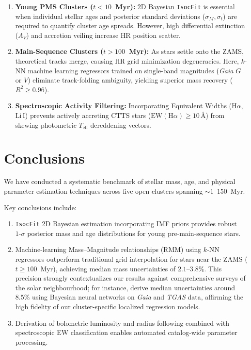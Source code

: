 \documentclass[preprints,article,submit,moreauthors,pdftex]{Definitions/mdpi}
\begin{document}
\begin{enumerate}
    \item \textbf{Young PMS Clusters ($t < 10$~Myr):} 2D Bayesian \texttt{IsocFit} is essential when individual stellar ages and posterior standard deviations ($\sigma_M, \sigma_t$) are required to quantify cluster age spreads. However, high differential extinction ($A_V$) and accretion veiling increase HR position scatter.
    \item \textbf{Main-Sequence Clusters ($t > 100$~Myr):} As stars settle onto the ZAMS, theoretical tracks merge, causing HR grid minimization degeneracies. Here, $k$-NN machine learning regressors trained on single-band magnitudes (\textit{Gaia} $G$ or $V$) eliminate track-folding ambiguity, yielding superior mass recovery ($R^2 \ge 0.96$).
    \item \textbf{Spectroscopic Activity Filtering:} Incorporating Equivalent Widths ($\text{H}\alpha$, $\text{Li}\,\text{I}$) prevents actively accreting CTTS stars ($\text{EW}(\text{H}\alpha) \ge 10\,\text{\AA}$) from skewing photometric $T_{\text{eff}}$ dereddening vectors.
\end{enumerate}


\section{Conclusions}
\label{sec:conclusions}

We have conducted a systematic benchmark of stellar mass, age, and physical parameter estimation techniques across five open clusters spanning $\sim 1\text{--}150$~Myr.

Key conclusions include:
\begin{enumerate}
    \item \texttt{IsocFit} 2D Bayesian estimation incorporating IMF priors provides robust $1\text{-}\sigma$ posterior mass and age distributions for young pre-main-sequence stars.
    \item Machine-learning Mass--Magnitude relationships (RMM) using $k$-NN regressors outperform traditional grid interpolation for stars near the ZAMS ($t \ge 100$~Myr), achieving median mass uncertainties of $2.1\text{--}3.8\%$. This precision strongly contextualizes our results against comprehensive surveys of the solar neighbourhood; for instance, \citet{das2019masses} derive median uncertainties around $8.5\%$ using Bayesian neural networks on \textit{Gaia} and \textit{TGAS} data, affirming the high fidelity of our cluster-specific localized regression models.
    \item Derivation of bolometric luminosity and radius following \citet{bell2014pre} combined with spectroscopic EW classification enables automated catalog-wide parameter processing.
\end{enumerate}
\end{document}
